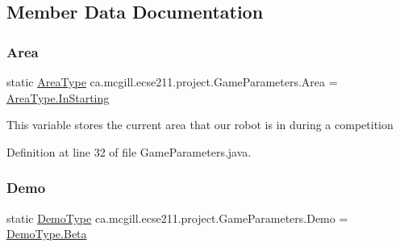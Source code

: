 \subsection{Member Data Documentation}
\mbox{\label{enumca_1_1mcgill_1_1ecse211_1_1project_1_1_game_parameters_a32080f9c0e2e23c0feefc272620a07ad}} 
\subsubsection{\texorpdfstring{Area}{Area}}
{\footnotesize\ttfamily  static  \hyperlink{enumca_1_1mcgill_1_1ecse211_1_1project_1_1_game_parameters_1_1_area_type}{Area\+Type} ca.\+mcgill.\+ecse211.\+project.\+Game\+Parameters.\+Area = \hyperlink{enumca_1_1mcgill_1_1ecse211_1_1project_1_1_game_parameters_1_1_area_type_a90e9cb33114c7af62aa86684942265e5}{Area\+Type.\+In\+Starting}\hspace{0.3cm}{\ttfamily [static]}}

This variable stores the current area that our robot is in during a competition 

Definition at line 32 of file Game\+Parameters.\+java.

\mbox{\label{enumca_1_1mcgill_1_1ecse211_1_1project_1_1_game_parameters_a36e932159f5f7e0f5e2e78f00d6f7e93}} 
\subsubsection{\texorpdfstring{Demo}{Demo}}
{\footnotesize\ttfamily  static  \hyperlink{enumca_1_1mcgill_1_1ecse211_1_1project_1_1_game_parameters_1_1_demo_type}{Demo\+Type} ca.\+mcgill.\+ecse211.\+project.\+Game\+Parameters.\+Demo = \hyperlink{enumca_1_1mcgill_1_1ecse211_1_1project_1_1_game_parameters_1_1_demo_type_a8d4e576df991cb52b50ae54b2812aa7f}{Demo\+Type.\+Beta}\hspace{0.3cm}{\ttfamily [static]}}

